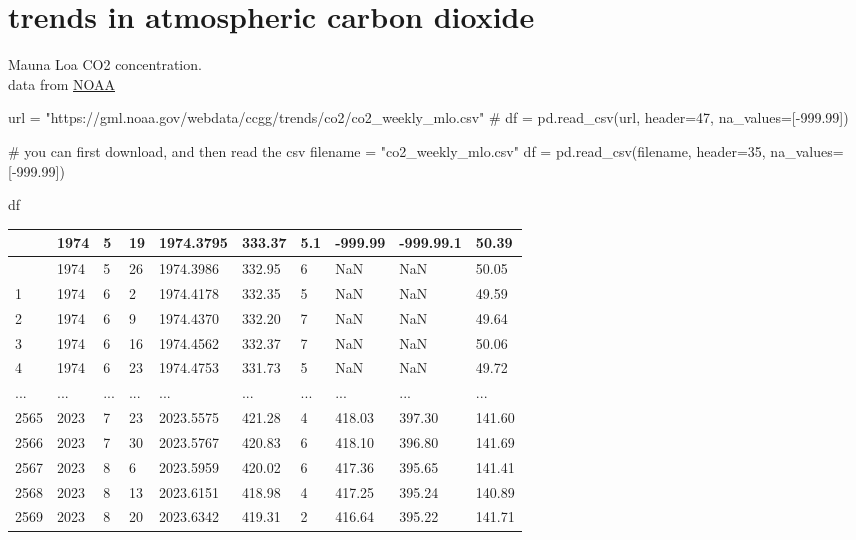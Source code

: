 \documentclass[
  letterpaper,
  DIV=11,
  numbers=noendperiod,
  oneside]{scrreprt}
\newenvironment{Shaded}{\begin{snugshade}}{\end{snugshade}}
\newcommand{\CommentTok}[1]{\textcolor[rgb]{0.37,0.37,0.37}{#1}}
\newcommand{\DecValTok}[1]{\textcolor[rgb]{0.68,0.00,0.00}{#1}}
\newcommand{\FloatTok}[1]{\textcolor[rgb]{0.68,0.00,0.00}{#1}}
\newcommand{\NormalTok}[1]{\textcolor[rgb]{0.00,0.23,0.31}{#1}}
\newcommand{\OperatorTok}[1]{\textcolor[rgb]{0.37,0.37,0.37}{#1}}
\newcommand{\StringTok}[1]{\textcolor[rgb]{0.13,0.47,0.30}{#1}}
\begin{document}
\hypertarget{trends-in-atmospheric-carbon-dioxide}{%
\section{trends in atmospheric carbon
dioxide}\label{trends-in-atmospheric-carbon-dioxide}}

Mauna Loa CO2 concentration.\\
data from \href{https://gml.noaa.gov/ccgg/trends/data.html}{NOAA}

\begin{Shaded}
\begin{Highlighting}[]
\NormalTok{url }\OperatorTok{=} \StringTok{"https://gml.noaa.gov/webdata/ccgg/trends/co2/co2\_weekly\_mlo.csv"}
\CommentTok{\# df = pd.read\_csv(url, header=47, na\_values=[{-}999.99])}

\CommentTok{\# you can first download, and then read the csv}
\NormalTok{filename }\OperatorTok{=} \StringTok{"co2\_weekly\_mlo.csv"}
\NormalTok{df }\OperatorTok{=}\NormalTok{ pd.read\_csv(filename, header}\OperatorTok{=}\DecValTok{35}\NormalTok{, na\_values}\OperatorTok{=}\NormalTok{[}\OperatorTok{{-}}\FloatTok{999.99}\NormalTok{])}

\NormalTok{df}
\end{Highlighting}
\end{Shaded}

\begin{longtable}[]{@{}llllllllll@{}}
\toprule\noalign{}
& 1974 & 5 & 19 & 1974.3795 & 333.37 & 5.1 & -999.99 & -999.99.1 &
50.39 \\
\midrule\noalign{}
\endhead
\bottomrule\noalign{}
\endlastfoot
0 & 1974 & 5 & 26 & 1974.3986 & 332.95 & 6 & NaN & NaN & 50.05 \\
1 & 1974 & 6 & 2 & 1974.4178 & 332.35 & 5 & NaN & NaN & 49.59 \\
2 & 1974 & 6 & 9 & 1974.4370 & 332.20 & 7 & NaN & NaN & 49.64 \\
3 & 1974 & 6 & 16 & 1974.4562 & 332.37 & 7 & NaN & NaN & 50.06 \\
4 & 1974 & 6 & 23 & 1974.4753 & 331.73 & 5 & NaN & NaN & 49.72 \\
... & ... & ... & ... & ... & ... & ... & ... & ... & ... \\
2565 & 2023 & 7 & 23 & 2023.5575 & 421.28 & 4 & 418.03 & 397.30 &
141.60 \\
2566 & 2023 & 7 & 30 & 2023.5767 & 420.83 & 6 & 418.10 & 396.80 &
141.69 \\
2567 & 2023 & 8 & 6 & 2023.5959 & 420.02 & 6 & 417.36 & 395.65 &
141.41 \\
2568 & 2023 & 8 & 13 & 2023.6151 & 418.98 & 4 & 417.25 & 395.24 &
140.89 \\
2569 & 2023 & 8 & 20 & 2023.6342 & 419.31 & 2 & 416.64 & 395.22 &
141.71 \\
\end{longtable}
\end{document}
